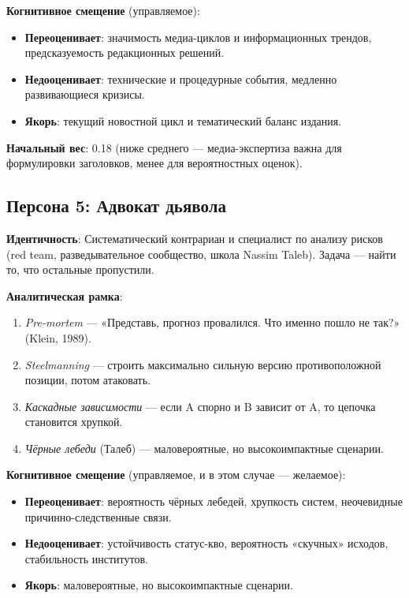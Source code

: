 \textbf{Когнитивное смещение} (управляемое):
\begin{itemize}
    \item \textbf{Переоценивает}: значимость медиа-циклов и информационных трендов, предсказуемость редакционных решений.
    \item \textbf{Недооценивает}: технические и процедурные события, медленно развивающиеся кризисы.
    \item \textbf{Якорь}: текущий новостной цикл и тематический баланс издания.
\end{itemize}

\textbf{Начальный вес}: 0.18 (ниже среднего — медиа-экспертиза важна для формулировки заголовков, менее для вероятностных оценок).

\subsection{Персона 5: Адвокат дьявола}

\textbf{Идентичность}: Систематический контрариан и специалист по анализу рисков (red team, разведывательное сообщество, школа Nassim Taleb). Задача — найти то, что остальные пропустили.

\textbf{Аналитическая рамка}:
\begin{enumerate}
    \item \emph{Pre-mortem} — «Представь, прогноз провалился. Что именно пошло не так?» (Klein, 1989).
    \item \emph{Steelmanning} — строить максимально сильную версию противоположной позиции, потом атаковать.
    \item \emph{Каскадные зависимости} — если A спорно и B зависит от A, то цепочка становится хрупкой.
    \item \emph{Чёрные лебеди} (Талеб) — маловероятные, но высокоимпактные сценарии.
\end{enumerate}

\textbf{Когнитивное смещение} (управляемое, и в этом случае — желаемое):
\begin{itemize}
    \item \textbf{Переоценивает}: вероятность чёрных лебедей, хрупкость систем, неочевидные причинно-следственные связи.
    \item \textbf{Недооценивает}: устойчивость статус-кво, вероятность «скучных» исходов, стабильность институтов.
    \item \textbf{Якорь}: маловероятные, но высокоимпактные сценарии.
\end{itemize}


